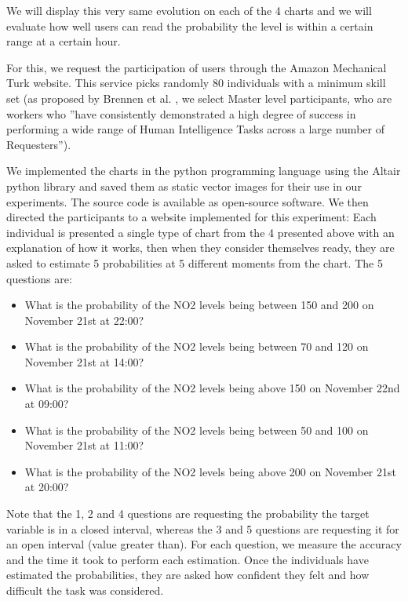 \documentclass[a4paper,3p,sort&compress]{elsarticle}
\begin{document}
We will display this very same evolution on each of the 4 charts and we will evaluate how well users can
read the probability the \no level is within a certain range at a certain hour.

For this, we request the participation of users through the Amazon Mechanical Turk website.
This service picks randomly 80 individuals with a minimum skill set (as proposed by Brennen
et al. \cite{brennen_instrument_2018}, we select Master level participants, who are workers who
''have consistently demonstrated a high degree of success in performing a wide range of Human Intelligence Tasks across a
large number of Requesters'').

We implemented the charts in the python programming language using the Altair python library
\cite{vanderplas2018altair} and saved them as static vector images for their use in our experiments. The source code is
available as open-source software. We then directed the participants to a website implemented for this experiment:
Each individual is presented a
single type of chart from the 4 presented above with an explanation of how it works,
then when they consider themselves ready, they are asked to estimate 5 probabilities at 5 different moments from the chart.
The 5 questions are:
\begin{itemize}
  \item What is the probability of the NO2 levels being between 150 and 200 on November 21st at 22:00?
  \item What is the probability of the NO2 levels being between 70 and 120 on November 21st at 14:00?
  \item What is the probability of the NO2 levels being above 150 on November 22nd at 09:00?
  \item What is the probability of the NO2 levels being between 50 and 100 on November 21st at 11:00?
  \item What is the probability of the NO2 levels being above 200 on November 21st at 20:00?
\end{itemize}

Note that the 1, 2 and 4 questions are requesting the probability the target variable is in a closed interval, whereas
the 3 and 5 questions are requesting it for an open interval (value greater than).
For each question, we measure the accuracy and the time it took to
perform each estimation. Once the individuals have estimated the probabilities, they are asked how confident they
felt and how difficult the task was considered.
\end{document}
